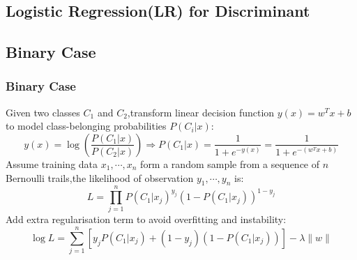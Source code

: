 \documentclass{beamer}
\begin{document}
\begin{CJK*}{UTF8}{gbsn}
\section{Logistic Regression(LR) for Discriminant}
\subsection{Binary Case}
\begin{frame}\frametitle{Binary Case}
Given two classes $C_1$ and $C_2$,transform linear decision function $y(x)=w^Tx+b$ to model class-belonging probabilities $P(C_i|x)$:
\begin{equation}
y(x)=\log(\frac{P(C_1|x)}{P(C_2|x)})\Longrightarrow P(C_1|x)=\frac{1}{1+e^{-y(x)}}=\frac{1}{1+e^{-(w^Tx+b)}}
\end{equation}
Assume training data $x_1,\cdots,x_n$ form a random sample from a sequence of $n$ Bernoulli trails,the likelihood of observation $y_1,\cdots,y_n$ is:
\begin{equation}
L=\prod_{j=1}^nP(C_1|x_j)^{y_j}(1-P(C_1|x_j))^{1-y_j}
\end{equation}
Add extra regularisation term to avoid overfitting and instability:
\begin{equation}
\log L=\sum_{j=1}^n\left[{y_j}P(C_1|x_j)+(1-y_j)(1-P(C_1|x_j))\right]-\lambda\|w\|
\end{equation}
\end{frame}

\end{CJK*}
\end{document}
